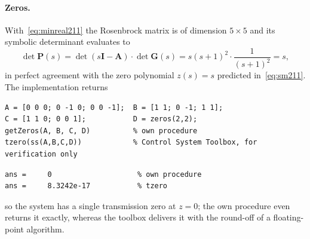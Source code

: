 \paragraph{Zeros.} With~\eqref{eq:minreal211} the Rosenbrock matrix is of dimension $5\times5$
and its symbolic determinant evaluates to
\begin{equation}
    \det\mathbf{P}(s) = \det(s\mathbf{I}-\mathbf{A})\cdot\det\mathbf{G}(s)
    = s(s+1)^2\cdot\frac{1}{(s+1)^2} = s ,
    \label{eq:detP211}
\end{equation}
in perfect agreement with the zero polynomial $z(s)=s$ predicted in~\eqref{eq:sm211}. The
implementation returns

\begin{lstlisting}
A = [0 0 0; 0 -1 0; 0 0 -1];  B = [1 1; 0 -1; 1 1];
C = [1 1 0; 0 0 1];           D = zeros(2,2);
getZeros(A, B, C, D)          % own procedure
tzero(ss(A,B,C,D))            % Control System Toolbox, for verification only
\end{lstlisting}
\begin{lstlisting}[style=matlabout]
ans =     0                    % own procedure
ans =     8.3242e-17           % tzero
\end{lstlisting}

\noindent so the system has a single transmission zero at $z=0$; the own procedure even returns
it exactly, whereas the toolbox delivers it with the round-off of a floating-point algorithm.


